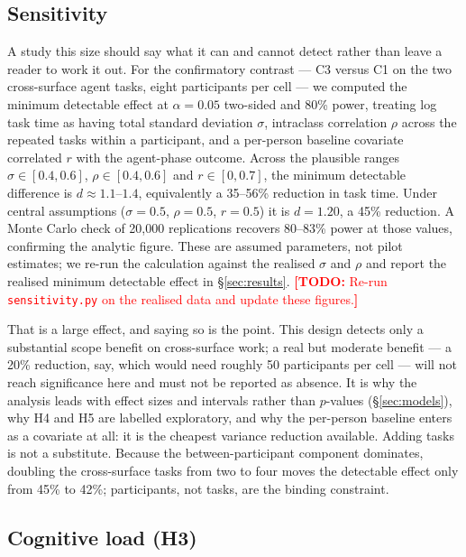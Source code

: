 \documentclass[acmsmall,review,screen]{acmart}
\newcommand{\todo}[1]{\textcolor{red}{\textbf{[TODO:} #1\textbf{]}}}
\newcommand{\code}[1]{\texttt{#1}}
\begin{document}
\subsection{Sensitivity}\label{sec:sensitivity}

A study this size should say what it can and cannot detect rather than leave a
reader to work it out. For the confirmatory contrast --- C3 versus C1 on the two
cross-surface agent tasks, eight participants per cell --- we computed the
minimum detectable effect at $\alpha = 0.05$ two-sided and 80\% power, treating
log task time as having total standard deviation $\sigma$, intraclass correlation
$\rho$ across the repeated tasks within a participant, and a per-person baseline
covariate correlated $r$ with the agent-phase outcome. Across the plausible
ranges $\sigma \in [0.4, 0.6]$, $\rho \in [0.4, 0.6]$ and $r \in [0, 0.7]$, the
minimum detectable difference is $d \approx 1.1$--$1.4$, equivalently a 35--56\%
reduction in task time. Under central assumptions ($\sigma = 0.5$, $\rho = 0.5$,
$r = 0.5$) it is $d = 1.20$, a 45\% reduction. A Monte Carlo check of
20{,}000 replications recovers 80--83\% power at those values, confirming the
analytic figure. These are assumed parameters, not pilot estimates; we re-run the
calculation against the realised $\sigma$ and $\rho$ and report the realised
minimum detectable effect in \S\ref{sec:results}. \todo{Re-run
\code{sensitivity.py} on the realised data and update these figures.}

That is a large effect, and saying so is the point. This design detects only a
substantial scope benefit on cross-surface work; a real but moderate benefit ---
a 20\% reduction, say, which would need roughly 50 participants per cell --- will
not reach significance here and must not be reported as absence. It is why the
analysis leads with effect sizes and intervals rather than $p$-values
(\S\ref{sec:models}), why H4 and H5 are labelled exploratory, and why the
per-person baseline enters as a covariate at all: it is the cheapest variance
reduction available. Adding tasks is not a substitute. Because the
between-participant component dominates, doubling the cross-surface tasks from
two to four moves the detectable effect only from 45\% to 42\%; participants,
not tasks, are the binding constraint.

\subsection{Cognitive load (H3)}
\end{document}
